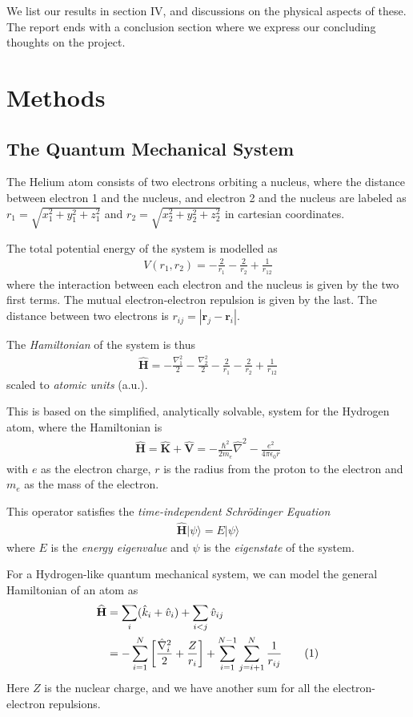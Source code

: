 \documentclass[twocolumns, a4paper,11pt,fleqn]{extarticle}
\newcommand{\eq}[1]{{\small\begin{align*}#1\end{align*}}}
\newcommand{\equ}[1]{{\small\begin{align}#1\end{align}}}
\newcommand{\ket}[1]{|#1\rangle}
\newcommand\numberthis{\addtocounter{equation}{1}\tag{\theequation}}
\renewcommand\vec[1]{\boldsymbol{\mathbf{#1}}}
\newcommand{\OP}[1]{\mathbf{\widehat{#1}}}
\newcommand{\op}[1]{\hat{#1}}
\begin{document}
We list our results in section IV, and discussions on the physical aspects of these.
The report ends with a conclusion section where we express our concluding thoughts
on the project.

\section{Methods}
\subsection{The Quantum Mechanical System}
The Helium atom consists of two electrons orbiting a nucleus,
where the distance between electron 1 and the nucleus,
and electron 2 and the nucleus are labeled as
$r_1 = \sqrt{x_1^2 + y_1^2 + z_1^2}$ 
and $r_2 = \sqrt{x_2^2 + y_2^2 + z_2^2}$ in cartesian coordinates.

The total potential energy of the system is modelled as
{\small
\eq{
    V(r_1,r_2)=-\frac{2}{r_1}-\frac{2}{r_2}+\frac{1}{r_{12}}
}}%
where the interaction between each electron and the nucleus
is given by the two first terms. 
The mutual electron-electron repulsion is given by the last.
The distance between two electrons is $r_{ij}=|\vec r_j-\vec r_i|$.

The \textit{Hamiltonian} of the system is thus
\eq{
    \OP H = -\frac{\nabla_1 ^2}{2} -\frac{\nabla_2 ^2}{2}
    -\frac{2}{r_1}-\frac{2}{r_2}+\frac{1}{r_{12}}
}
scaled to \textit{atomic units} (a.u.).

This is based on the simplified, analytically solvable, system for the 
Hydrogen atom, where the Hamiltonian is
\equ{
  \OP H = \OP K + \OP V = -\frac{\hbar^2}{2m_e}\op \nabla^2 
  - \frac{e^2}{4\pi \epsilon_0 r} \label{eq:hydro}
}
with $e$ as the electron charge, $r$ is the radius from the proton to the electron
and $m_e$ as the mass of the electron.

This operator satisfies the \textit{time-independent Schr\"odinger Equation}
\equ{
  \OP H \ket{\psi} = E \ket{\psi}\label{eq:schrod}
}
where $E$ is the \textit{energy eigenvalue} and $\psi$ is the \textit{eigenstate} of the system.

For a Hydrogen-like quantum mechanical system, we can model the general
Hamiltonian of an atom as
\eq{
  \OP H
  &=\sum_i (\op k_i + \op v_i)  + \sum_{i<j} \op v_{ij}\\
  &= -\sum_{i=1}^N\bigg[
    \frac{\op\nabla_i^2}{2} + \frac{Z}{r_i}\bigg] 
  + \sum_{i=1}^{N-1}\sum_{j=i+1}^N\frac{1}{r_{ij}} \numberthis\label{ham}
}
Here $Z$ is the nuclear charge, 
and we have another sum for all the electron-electron repulsions.
\end{document}
